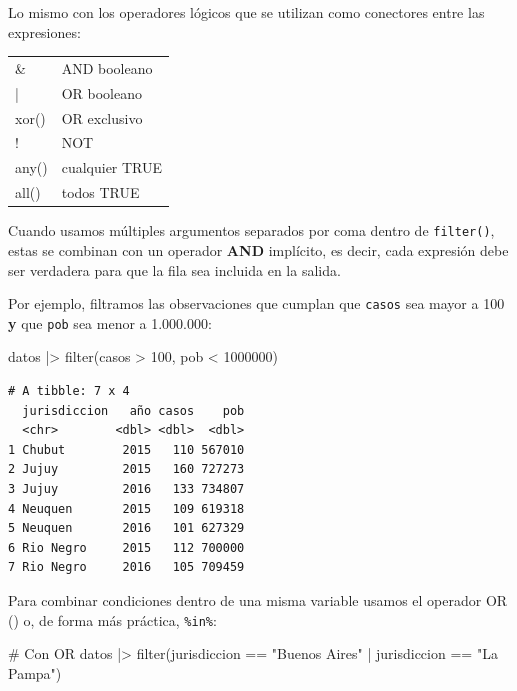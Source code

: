 \documentclass[
  spanish,
  letterpaper,
  DIV=11,
  numbers=noendperiod]{scrreprt}
\newenvironment{Shaded}{\begin{snugshade}}{\end{snugshade}}
\newcommand{\CommentTok}[1]{\textcolor[rgb]{0.37,0.37,0.37}{#1}}
\newcommand{\DecValTok}[1]{\textcolor[rgb]{0.68,0.00,0.00}{#1}}
\newcommand{\FunctionTok}[1]{\textcolor[rgb]{0.28,0.35,0.67}{#1}}
\newcommand{\NormalTok}[1]{\textcolor[rgb]{0.00,0.23,0.31}{#1}}
\newcommand{\SpecialCharTok}[1]{\textcolor[rgb]{0.37,0.37,0.37}{#1}}
\newcommand{\StringTok}[1]{\textcolor[rgb]{0.13,0.47,0.30}{#1}}
\begin{document}
Lo mismo con los operadores lógicos que se utilizan como conectores
entre las expresiones:

\begin{table}
\centering
\begin{tabular}[t]{l|l}
\hline
\cellcolor[HTML]{2f2e4e}{\textcolor{white}{Operador}} & \cellcolor[HTML]{2f2e4e}{\textcolor{white}{Descripción}}\\
\hline
\& & AND booleano\\
\hline
| & OR booleano\\
\hline
xor() & OR exclusivo\\
\hline
! & NOT\\
\hline
any() & cualquier TRUE\\
\hline
all() & todos TRUE\\
\hline
\end{tabular}
\end{table}

Cuando usamos múltiples argumentos separados por coma dentro de
\texttt{filter()}, estas se combinan con un operador \textbf{AND}
implícito, es decir, cada expresión debe ser verdadera para que la fila
sea incluida en la salida.

Por ejemplo, filtramos las observaciones que cumplan que \texttt{casos}
sea mayor a 100 \textbf{y} que \texttt{pob} sea menor a 1.000.000:

\begin{Shaded}
\begin{Highlighting}[]
\NormalTok{datos }\SpecialCharTok{|\textgreater{}}
  \FunctionTok{filter}\NormalTok{(casos }\SpecialCharTok{\textgreater{}} \DecValTok{100}\NormalTok{, pob }\SpecialCharTok{\textless{}} \DecValTok{1000000}\NormalTok{)}
\end{Highlighting}
\end{Shaded}

\begin{verbatim}
# A tibble: 7 x 4
  jurisdiccion   año casos    pob
  <chr>        <dbl> <dbl>  <dbl>
1 Chubut        2015   110 567010
2 Jujuy         2015   160 727273
3 Jujuy         2016   133 734807
4 Neuquen       2015   109 619318
5 Neuquen       2016   101 627329
6 Rio Negro     2015   112 700000
7 Rio Negro     2016   105 709459
\end{verbatim}

Para combinar condiciones dentro de una misma variable usamos el
operador OR (\texttt{\textbar{}}) o, de forma más práctica,
\texttt{\%in\%}:

\begin{Shaded}
\begin{Highlighting}[]
\CommentTok{\# Con OR}
\NormalTok{datos }\SpecialCharTok{|\textgreater{}}
  \FunctionTok{filter}\NormalTok{(jurisdiccion }\SpecialCharTok{==} \StringTok{"Buenos Aires"} \SpecialCharTok{|}\NormalTok{ jurisdiccion }\SpecialCharTok{==} \StringTok{"La Pampa"}\NormalTok{)}
\end{Highlighting}
\end{Shaded}
\end{document}

